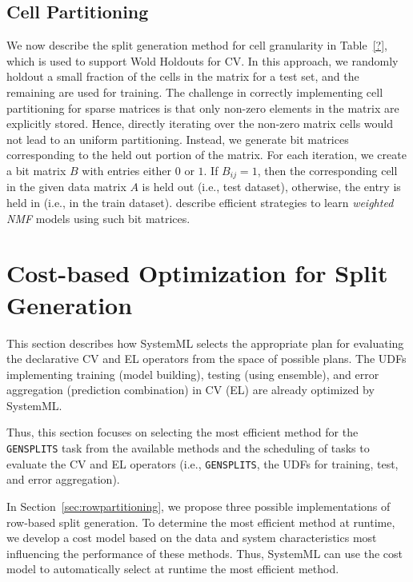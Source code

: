 \documentclass{vldb}
\begin{document}
\subsection{Cell Partitioning}
\label{sec:cell-part}
We now describe the split generation method for cell granularity in Table~\ref{?}, which 
is used to support Wold Holdouts for CV. 
In this approach, we randomly holdout a small fraction of the cells in the matrix for a test set, and the remaining are used for training.
The challenge in correctly implementing cell partitioning for sparse matrices is that only non-zero elements in the matrix are explicitly stored.  Hence, directly iterating over the non-zero matrix cells would not lead to an uniform partitioning.
Instead, we generate bit matrices corresponding to the held out portion of the matrix.
For each iteration, we create a bit matrix $B$ with entries either $0$ or $1$. 
If $B_{ij} = 1$, then the corresponding cell in the given data matrix $A$ is held out 
(i.e., test dataset), otherwise, the entry is held in (i.e., in the train dataset).
\cite{nips2010} describe efficient strategies to learn {\em weighted NMF} models using such bit matrices.

\section{Cost-based Optimization for Split Generation}
\label{sec:optimization}

This section describes how SystemML selects the appropriate plan for evaluating the declarative
CV and EL operators from the space of possible plans.
The UDFs implementing training (model building), testing (using ensemble),
and error aggregation (prediction combination) in CV (EL) are already optimized by SystemML.

Thus, this section focuses on selecting the most efficient method for the {\tt GENSPLITS} task from the available methods and the scheduling of tasks to evaluate the CV and EL operators (i.e., {\tt GENSPLITS}, the UDFs for training, test, and error aggregation).

In Section~\ref{sec:rowpartitioning}, we propose three possible implementations of
row-based split generation. To determine the most efficient method at runtime, we develop a cost model based on the data and system characteristics most influencing the performance of these methods. Thus, SystemML can use the cost model to automatically select at runtime the most efficient method.
\end{document}
